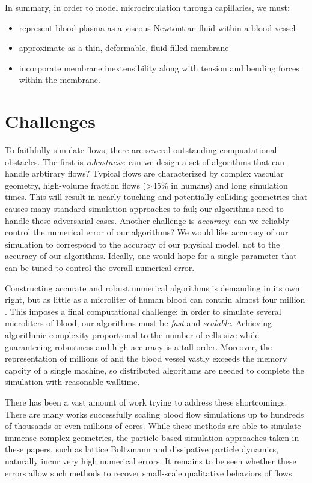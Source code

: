 In summary, in order to model microcirculation through capillaries, we must:
\begin{itemize}
    \item represent blood plasma as a viscous Newtontian fluid within a blood vessel
    \item approximate \rbcs as a thin, deformable, fluid-filled membrane 
    \item incorporate \rbc membrane inextensibility along with tension and bending forces within the membrane.
\end{itemize}

\section{Challenges}
To faithfully simulate \rbc flows, there are several outstanding compuatational obstacles.
The first is \textit{robustness}: can we design a set of algorithms that can handle arbtirary flows?
Typical flows are characterized by complex vascular geometry, high-volume fraction flows (>45\% in humans) and long simulation times. 
This will result in nearly-touching and potentially colliding geometries that causes many standard simulation approaches to fail; our algorithms need to handle these adversarial cases.
Another challenge is \textit{accuracy}: can we reliably control the numerical error of our algorithms?
We would like accuracy of our simulation to correspond to the accuracy of our physical model, not to the accuracy of our algorithms.
Ideally, one would hope for a single parameter that can be tuned to control the overall numerical error.

Constructing accurate and robust numerical algorithms is demanding in its own right, but as little as a microliter of human blood can contain almost four million \rbcs.
This imposes a final computational challenge: in order to simulate several microliters of blood, our algorithms must be \textit{fast} and \textit{scalable}.
Achieving algorithmic complexity proportional to the number of cells size while guaranteeing robustness and high accuracy is a tall order.
Moreover, the representation of millions of \rbcs and the blood vessel vastly exceeds the memory capcity of a single machine, so distributed algorithms are needed to complete the simulation with reasonable walltime.

There has been a vast amount of work trying to address these shortcomings. 
There are many works successfully scaling blood flow simulations up to hundreds of thousands \cite{grinberg2011new,rossinelli2015silico} or even millions \cite{gounley2017computational,randles2015massively} of cores.
While these methods are able to simulate immense complex geometries, the particle-based simulation approaches taken in these papers, such as lattice Boltzmann and dissipative particle dynamics, naturally incur very high numerical errors.
It remains to be seen whether these errors allow such methods to recover small-scale qualitative behaviors of \rbc flows.

